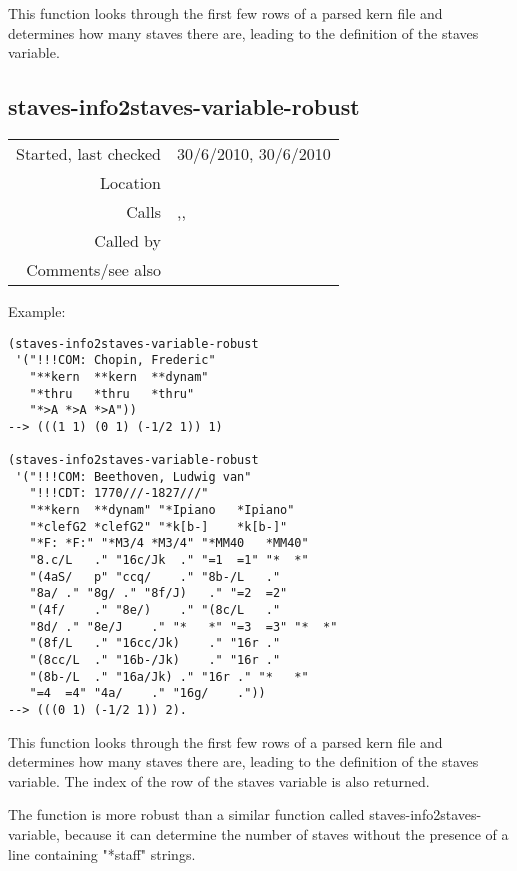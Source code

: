 \noindent This function looks through the first few
rows of a parsed kern file and determines how many
staves there are, leading to the definition of the
staves variable.


\subsection*{staves-info2staves-variable-robust}\label{fun:staves-info2staves-variable-robust}

\vspace{0.3cm}
\begin{tabular}{r|p{8cm}}
Started, last checked & 30/6/2010, 30/6/2010 \\
Location & \nameref{sec:kern} \\
Calls & \nameref{fun:staves-info2staves-variable},\newline \nameref{fun:staves-variable-index},\newline \nameref{fun:tab-separated-string2list} \\
Called by & \nameref{fun:kern-file2dataset-by-col} \\
Comments/see also &
\end{tabular}

\vspace{0.5cm}
\noindent Example:
\begin{verbatim}
(staves-info2staves-variable-robust
 '("!!!COM: Chopin, Frederic"
   "**kern	**kern	**dynam"
   "*thru	*thru	*thru"
   "*>A	*>A	*>A"))
--> (((1 1) (0 1) (-1/2 1)) 1)

(staves-info2staves-variable-robust
 '("!!!COM: Beethoven, Ludwig van"
   "!!!CDT: 1770///-1827///"
   "**kern	**dynam" "*Ipiano	*Ipiano"
   "*clefG2	*clefG2" "*k[b-]	*k[b-]"
   "*F:	*F:" "*M3/4	*M3/4" "*MM40	*MM40"
   "8.c/L	." "16c/Jk	." "=1	=1" "*	*"
   "(4aS/	p" "ccq/	." "8b-/L	."
   "8a/	." "8g/	." "8f/J)	." "=2	=2"
   "(4f/	." "8e/)	." "(8c/L	."
   "8d/	." "8e/J	." "*	*" "=3	=3" "*	*"
   "(8f/L	." "16cc/Jk)	." "16r	."
   "(8cc/L	." "16b-/Jk)	." "16r	."
   "(8b-/L	." "16a/Jk)	." "16r	." "*	*"
   "=4	=4" "4a/	." "16g/	."))
--> (((0 1) (-1/2 1)) 2).
\end{verbatim}

\noindent This function looks through the first few
rows of a parsed kern file and determines how many
staves there are, leading to the definition of the
staves variable. The index of the row of the staves
variable is also returned.

The function is more robust than a similar function
called staves-info2staves-variable, because it can
determine the number of staves without the presence of
a line containing "*staff" strings.


